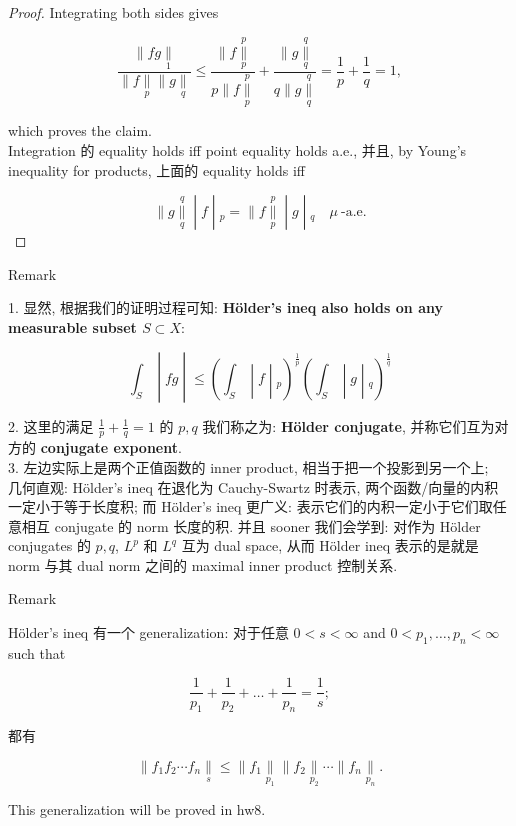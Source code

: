 \documentclass{qlnotes-export}
\begin{document}
\begin{proof}
Integrating both sides gives

\[\frac{\parallel fg\underset{1}{\parallel}}{\parallel f\underset{p}{\parallel} \parallel g\underset{q}{\parallel}} \leq \frac{\parallel f\underset{p}{\overset{p}{\parallel}}}{p \parallel f\underset{p}{\overset{p}{\parallel}}} + \frac{\parallel g\underset{q}{\overset{q}{\parallel}}}{q \parallel g\underset{q}{\overset{q}{\parallel}}} = \frac{1}{p} + \frac{1}{q} = 1,\]

which proves the claim.\\
Integration 的 equality holds iff point equality holds a.e., 并且, by Young's inequality for products, 上面的 equality holds iff

\[\left. \parallel g\underset{q}{\overset{q}{\parallel}} \middle| f \middle| {}_{p} = \parallel f\underset{p}{\overset{p}{\parallel}} \middle| g \middle| {}_{q}\quad\mu\ \text{-a.e.} \right.\]

\end{proof}

\begin{qlremark}{Remark}

1. 显然, 根据我们的证明过程可知: \textbf{Hölder's ineq also holds on any measurable subset \(S \subset X\)}:

\[\left. \int_{S} \middle| fg \middle| \leq (\int_{S} \middle| f \middle| {}_{p})^{\frac{1}{p}}(\int_{S} \middle| g \middle| {}_{q})^{\frac{1}{q}} \right.\]

2. 这里的满足 \(\frac{1}{p} + \frac{1}{q} = 1\) 的 \(p,q\) 我们称之为: \textbf{Hölder conjugate}, 并称它们互为对方的 \textbf{conjugate exponent}.\\
3. 左边实际上是两个正值函数的 inner product, 相当于把一个投影到另一个上;\\
几何直观: Hölder's ineq 在退化为 Cauchy-Swartz 时表示, 两个函数/向量的内积一定小于等于长度积; 而 Hölder's ineq 更广义: 表示它们的内积一定小于它们取任意相互 conjugate 的 norm 长度的积. 并且 sooner 我们会学到: 对作为 Hölder conjugates 的 \(p,q\), \(L^{p}\) 和 \(L^{q}\) 互为 dual space, 从而 Hölder ineq 表示的是就是 norm 与其 dual norm 之间的 maximal inner product 控制关系.

\end{qlremark}

\begin{qlremark}{Remark}

Hölder's ineq 有一个 generalization: 对于任意 \(0 < s < \infty\) and \(0 < p_{1},\ldots,p_{n} < \infty\) such that

\[\frac{1}{p_{1}} + \frac{1}{p_{2}} + \ldots + \frac{1}{p_{n}} = \frac{1}{s};\]

都有

\[\parallel f_{1}f_{2}\cdots f_{n}\underset{s}{\parallel} \leq \parallel f_{1}\underset{p_{1}}{\parallel} \parallel f_{2}\underset{p_{2}}{\parallel}\cdots \parallel f_{n}\underset{p_{n}}{\parallel}.\]

This generalization will be proved in hw8.

\end{qlremark}
\end{document}
